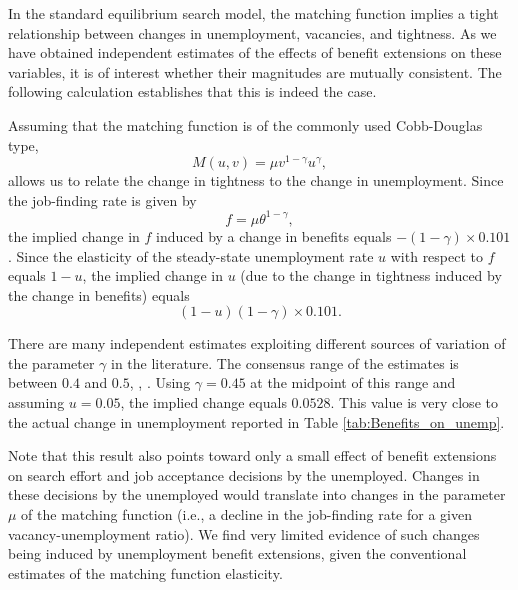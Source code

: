 \documentclass[12pt]{article}
\newcommand{\1}{\mathbf{1}}
\begin{document}
In the standard equilibrium search model, the matching function implies a tight relationship between changes in unemployment, vacancies, and tightness. As we have obtained independent estimates of the effects of benefit extensions on these variables, it is of interest whether their magnitudes are mutually consistent. The following calculation establishes that this is indeed the case.

Assuming that the matching function is of the commonly used Cobb-Douglas type,
\begin{equation*}
M(u,v) = \mu v^{1-\gamma} u^{\gamma},
\end{equation*}
allows us to relate the change in tightness to the change in unemployment.
Since the job-finding rate is given by
\begin{equation*}
f = \mu \theta^{1-\gamma},
\end{equation*}
the implied change in $f$ induced by a change in benefits equals $- (1-\gamma) \times 0.101$. Since the elasticity of the steady-state unemployment rate $u$ with respect to $f$ equals $1-u$, the implied change in $u$ (due to the change in tightness induced by the change in benefits) equals
\begin{equation*}
(1-u) (1-\gamma) \times 0.101.
\end{equation*}



There are many independent estimates exploiting different sources of variation of the parameter $\gamma$ in the literature. The consensus range of the estimates is between $0.4$ and $0.5$, \citet{brugemann:08}, \citet{petrongolo_pissarides:01}. Using $\gamma = 0.45$ at the midpoint of this range and assuming $u = 0.05$, the implied change equals $0.0528$. This value is very close to the actual change in unemployment reported in Table \ref{tab:Benefits_on_unemp}.

Note that this result also points toward only a small effect of benefit extensions on search effort and job acceptance decisions by the unemployed. Changes in these decisions by the unemployed would translate into changes in the parameter $\mu$ of the matching function (i.e., a decline in the job-finding rate for a given vacancy-unemployment ratio). We find very limited evidence of such changes being induced by unemployment benefit extensions, given the conventional estimates of the matching function elasticity.
\end{document}
